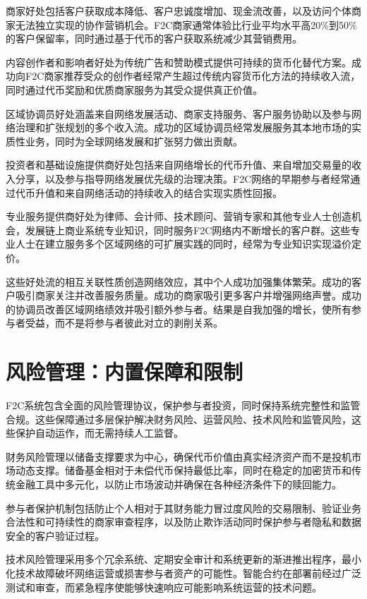 \documentclass[
  Letterpaper,
]{scrbook}
\begin{document}
商家好处包括客户获取成本降低、客户忠诚度增加、现金流改善，以及访问个体商家无法独立实现的协作营销机会。F2C商家通常体验比行业平均水平高20\%到50\%的客户保留率，同时通过基于代币的客户获取系统减少其营销费用。

内容创作者和影响者好处为传统广告和赞助模式提供可持续的货币化替代方案。成功向F2C商家推荐受众的创作者经常产生超过传统内容货币化方法的持续收入流，同时通过代币奖励和优质商家服务为其受众提供真正价值。

区域协调员好处涵盖来自网络发展活动、商家支持服务、客户服务协助以及参与网络治理和扩张规划的多个收入流。成功的区域协调员经常发展服务其本地市场的实质性业务，同时为全球网络发展和扩张努力做出贡献。

投资者和基础设施提供商好处包括来自网络增长的代币升值、来自增加交易量的收入分享，以及参与指导网络发展优先级的治理决策。F2C网络的早期参与者经常通过代币升值和来自网络活动的持续收入的结合实现实质性回报。

专业服务提供商好处为律师、会计师、技术顾问、营销专家和其他专业人士创造机会，发展链上商业系统专业知识，同时服务F2C网络内不断增长的客户群。这些专业人士在建立服务多个区域网络的可扩展实践的同时，经常为专业知识实现溢价定价。

这些好处流的相互关联性质创造网络效应，其中个人成功加强集体繁荣。成功的客户吸引商家关注并改善服务质量。成功的商家吸引更多客户并增强网络声誉。成功的协调员改善区域网络绩效并吸引额外参与者。结果是自我加强的增长，使所有参与者受益，而不是将参与者彼此对立的剥削关系。

\section{风险管理：内置保障和限制}\label{ux98ceux9669ux7ba1ux7406ux5185ux7f6eux4fddux969cux548cux9650ux5236}

F2C系统包含全面的风险管理协议，保护参与者投资，同时保持系统完整性和监管合规。这些保障通过多层保护解决财务风险、运营风险、技术风险和监管风险，这些保护自动运作，而无需持续人工监督。

财务风险管理以储备支撑要求为中心，确保代币价值由真实经济资产而不是投机市场动态支撑。储备基金相对于未偿代币保持最低比率，同时在稳定的加密货币和传统金融工具中多元化，以防止市场波动并确保在各种经济条件下的赎回能力。

参与者保护机制包括防止个人相对于其财务能力冒过度风险的交易限制、验证业务合法性和可持续性的商家审查程序，以及防止欺诈活动同时保护参与者隐私和数据安全的客户验证过程。

技术风险管理采用多个冗余系统、定期安全审计和系统更新的渐进推出程序，最小化技术故障破坏网络运营或损害参与者资产的可能性。智能合约在部署前经过广泛测试和审查，而紧急程序使能够快速响应可能影响系统运营的技术问题。
\end{document}
